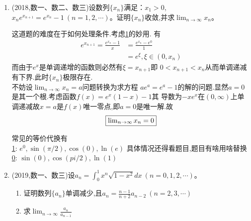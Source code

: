 \documentclass[12pt, a4paper, oneside, UTF8]{ctexbook}
\begin{document}
\begin{enumerate}[label=\arabic*.,start=15]
    \item  (2018,数一、数二、数三)设数列$\{x_n\}$满足：$x_1>0$,$x_ne^{x_{n+1}}=e^{x_n}-1\ (n=1,2,\cdots)$。证明$\{x_n\}$收敛,并求$\lim_{n\to\infty}x_n$。
    
    \begin{solution}
    这道题的难度在于如何处理条件.考虑\underline{1}的妙用. 有
    \begin{align*}
        e^{x_{n+1}}=\frac{e^{x_n}-1}{x} &=\frac{e^{x_n}-e^{0}}{1} \\
        &= e^{\xi}, \xi\in(0,x_n)
    \end{align*}
    而由于$e^x$是单调递增的函数则必然有$\xi=x_{n+1}$即 $0<x_{n+1}<x_n$从而单调递减有下界.此时$\{x_n\}$极限存在. \\
    不妨设$\lim_{n\to\infty}x_n=a$问题转换为求方程 $ae^a=e^a-1$的解的问题.显然$a=0$是其一个根.考虑函数$f(x)=e^{x}(1-x)-1$其
    导数为$-xe^x$在$(0,\infty)$上单调递减故$x=a$是$f(x)$唯一零点,即$a=0$是唯一解.故
    $$
    \fbox{$\lim_{n\to\infty}x_n=0$}
    $$
    \end{solution}
    
    \begin{tcolorbox}
        常见的等价代换有 \\
        \underline{1}: $e^{0},\sin(\pi/2),\cos(0),\ln(e)$ 具体情况还得看题目,题目有啥用啥替换 \\
        \underline{0}: $\sin(0),\cos(pi/2),\ln(1)$ 
    \end{tcolorbox}
    \item  (2019,数一、数三)设$a_n=\int_0^1 x^n\sqrt{1-x^2}dx\ (n=0,1,2,\cdots)$。
    \begin{enumerate}[label=(\roman*)]
        \item 证明数列$\{a_n\}$单调减少,且$a_n=\frac{n-1}{n+2}a_{n-2}\ (n=2,3,\cdots)$
        \item 求$\lim_{n\to\infty}\frac{a_n}{a_{n-1}}$
    \end{enumerate}
    

\end{enumerate}
\end{document}
